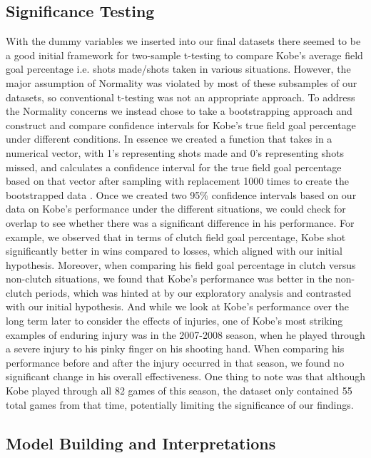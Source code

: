 \documentclass[paper=a4, fontsize=11pt]{scrartcl} %
\numberwithin{equation}{section} %
\numberwithin{figure}{section} %
\numberwithin{table}{section} %
\begin{document}
\subsection{Significance Testing}
\hspace*{1cm}With the dummy variables we inserted into our final datasets there seemed to be a good initial framework for two-sample t-testing to compare Kobe's average field goal percentage i.e. shots made/shots taken in various situations. However, the major assumption of Normality was violated by most of these subsamples of our datasets, so conventional t-testing was not an appropriate approach. To address the Normality concerns we instead chose to take a bootstrapping approach and construct and compare confidence intervals for Kobe's true field goal percentage under different conditions. In essence we created a function that takes in a numerical vector, with 1's representing shots made and 0's representing shots missed, and calculates a confidence interval for the true field goal percentage based on that vector after sampling with replacement 1000 times to create the bootstrapped data \cite{bootstraptheory}. Once we created two 95\% confidence intervals based on our data on Kobe's performance under the different situations, we could check for overlap to see whether there was a significant difference in his performance. For example, we observed that in terms of clutch field goal percentage, Kobe shot significantly better in wins compared to losses, which aligned with our initial hypothesis. Moreover, when comparing his field goal percentage in clutch versus non-clutch situations, we found that Kobe's performance was better in the non-clutch periods, which was hinted at by our exploratory analysis and contrasted with our initial hypothesis. And while we look at Kobe's performance over the long term later to consider the effects of injuries, one of Kobe's most striking examples of enduring injury was in the 2007-2008 season, when he played through a severe injury to his pinky finger on his shooting hand. When comparing his performance before and after the injury occurred in that season, we found no significant change in his overall effectiveness. One thing to note was that although Kobe played through all 82 games of this season, the dataset only contained 55 total games from that time, potentially limiting the significance of our findings. 
\subsection{Model Building and Interpretations}
\end{document}
